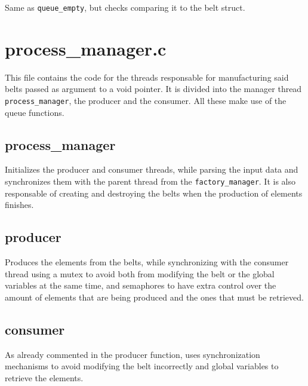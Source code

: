 \documentclass[es]{uc3mreport}
\begin{document}
\begin{report}
      \setcounter{subsubsection}{0}

      Same as \texttt{queue\_empty}, but checks comparing it to the belt
      struct.

      \section{process\_manager.c}

      \setcounter{subsection}{0}

      \setcounter{subsubsection}{0}

      This file contains the code for the threads responsable for
      manufacturing said belts passed as argument to a void pointer. It
      is divided into the manager thread \texttt{process\_manager},
      the producer and the consumer. All these make use of the queue
      functions.

      \subsection{process\_manager}

      \setcounter{subsubsection}{0}

      Initializes the producer and consumer threads, while parsing the
      input data and synchronizes them with the parent thread from the
      \texttt{factory\_manager}. It is also responsable of creating and
      destroying the belts when the production of elements finishes.

      \subsection{producer}

      \setcounter{subsubsection}{0}

      Produces the elements from the belts, while synchronizing with the
      consumer thread using a mutex to avoid both from modifying the
      belt or the global variables at the same time, and semaphores to
      have extra control over the amount of elements that are being
      produced and the ones that must be retrieved.

      \subsection{consumer}

      \setcounter{subsubsection}{0}

      As already commented in the producer function, uses
      synchronization mechanisms to avoid modifying the belt incorrectly
      and global variables to retrieve the elements.


\end{report}
\end{document}

